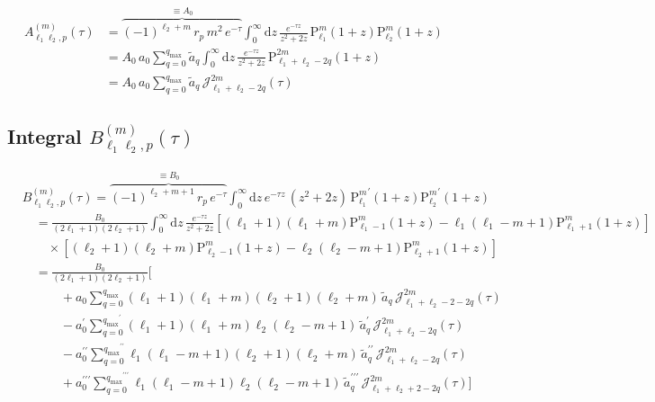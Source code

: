 \documentclass[10pt]{article}
\newcommand{\e}{e}    %
\newcommand{\Plm}[2]{{\text{P}_{#1}^{#2}}}
\newcommand{\sep}{\quad}
\newcommand{\qmax}{{q_\text{max}}}
\begin{document}
\begin{align}
\nonumber
A_{\ell_1\ell_2,p}^{(m)}(\tau) &= \overbrace{(-1)^{\ell_2+m} \, r_p \, m^2 \, \e^{-\tau}}^{\equiv A_0} \int_0^\infty \mathrm{d}z \, \frac{\e^{-\tau z}}{z^2+2z} \, \Plm{\ell_1}{m}(1+z) \Plm{\ell_2}{m}(1+z) \\
\nonumber
&= A_0 \, a_0 \sum_{q=0}^\qmax \tilde a_q \int_0^\infty \mathrm{d}z \, \frac{\e^{-\tau z}}{z^2+2z} \, \Plm{\ell_1+\ell_2-2q}{2m}(1+z) \\
&= A_0 \, a_0 \sum_{q=0}^\qmax \tilde a_q \, \mathcal{J}_{\ell_1+\ell_2-2q}^{2m}(\tau)
\end{align}


\subsection{Integral $B_{\ell_1\ell_2,p}^{(m)}(\tau)$}

\begin{align}
\nonumber
&B_{\ell_1\ell_2,p}^{(m)}(\tau) = \overbrace{(-1)^{\ell_2+m+1} \, r_p \, \e^{-\tau}}^{\equiv B_0} \int_0^\infty \mathrm{d}z \, \e^{-\tau z} \, (z^2+2z) \, \Plm{\ell_1}{m}^\prime(1+z) \Plm{\ell_2}{m}^\prime(1+z) \\
\nonumber
&\sep = \frac{B_0}{(2\ell_1+1)(2\ell_2+1)} \int_0^\infty \mathrm{d}z \, \frac{\e^{-\tau z}}{z^2+2z} \left[ (\ell_1+1)(\ell_1+m)\Plm{\ell_1-1}{m}(1+z) - \ell_1(\ell_1-m+1)\Plm{\ell_1+1}{m}(1+z) \right] \\
\nonumber
& \sep\sep \times \left[ (\ell_2+1)(\ell_2+m)\Plm{\ell_2-1}{m}(1+z) - \ell_2(\ell_2-m+1)\Plm{\ell_2+1}{m}(1+z) \right] \\
\nonumber
&\sep = \frac{B_0}{(2\ell_1+1)(2\ell_2+1)} \Bigg[ \\
\nonumber
   &\sep\sep\sep +a_0                      \sum_{q=0}^\qmax                        (\ell_1+1)(\ell_1+m)(\ell_2+1)(\ell_2+m) \, \tilde a_q \, \mathcal{J}_{\ell_1+\ell_2-2-2q}^{2m}(\tau) \\
\nonumber
   &\sep\sep\sep -a_0^\prime               \sum_{q=0}^{\qmax^\prime}               (\ell_1+1)(\ell_1+m)\ell_2(\ell_2-m+1)   \, \tilde a_q^\prime \, \mathcal{J}_{\ell_1+\ell_2-2q}^{2m}(\tau) \\
\nonumber
   &\sep\sep\sep -a_0^{\prime\prime}       \sum_{q=0}^{\qmax^{\prime\prime}}       \ell_1(\ell_1-m+1)(\ell_2+1)(\ell_2+m)   \, \tilde a_q^{\prime\prime} \, \mathcal{J}_{\ell_1+\ell_2-2q}^{2m}(\tau) \\
   &\sep\sep\sep +a_0^{\prime\prime\prime} \sum_{q=0}^{\qmax^{\prime\prime\prime}} \ell_1(\ell_1-m+1)\ell_2(\ell_2-m+1)     \, \tilde a_q^{\prime\prime\prime} \, \mathcal{J}_{\ell_1+\ell_2+2-2q}^{2m}(\tau) \Bigg]
\end{align}
\end{document}
